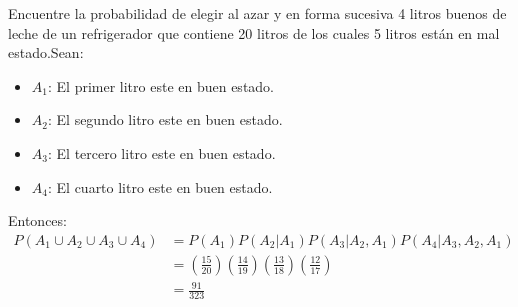 \begin{ejemplo}
    Encuentre la probabilidad de elegir al azar y en forma sucesiva 4 litros buenos de leche de un refrigerador que contiene 20 litros de los cuales 5 litros están en mal estado.Sean: \begin{itemize}
        \item $A_1$: El primer litro este en buen estado.
        \item $A_2$: El segundo litro este en buen estado.
        \item $A_3$: El tercero litro este en buen estado.
        \item $A_4$: El cuarto litro este en buen estado.
    \end{itemize}
    Entonces:
    \begin{align*}
        P(A_1 \cup A_2 \cup A_3 \cup A_4) & = P(A_1)P(A_2|A_1)P(A_3|A_2,A_1)P(A_4|A_3,A_2,A_1)                                                         \\
                                          & = \left(\frac{15}{20}\right)\left(\frac{14}{19}\right)\left(\frac{13}{18}\right)\left(\frac{12}{17}\right) \\
                                          & = \frac{91}{323}
    \end{align*}
\end{ejemplo}
